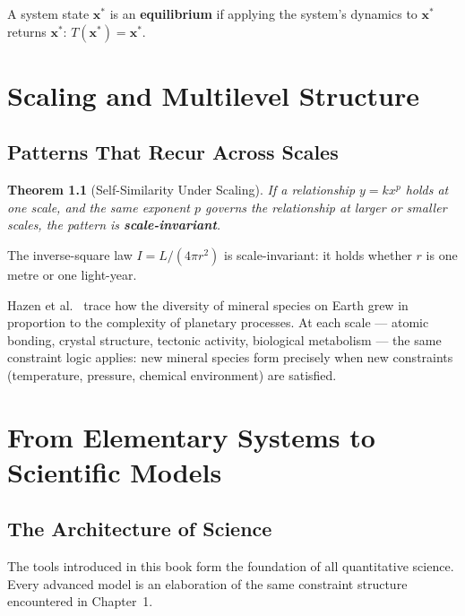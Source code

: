 \documentclass[11pt, openany]{book}
\theoremstyle{plain}
\newtheorem{theorem}{Theorem}[chapter]
\theoremstyle{definition}
\theoremstyle{remark}
\begin{document}
\begin{mydefinition}[Equilibrium]
A system state $\mathbf{x}^*$ is an \textbf{equilibrium} if applying the
system's dynamics to $\mathbf{x}^*$ returns $\mathbf{x}^*$:
$T(\mathbf{x}^*)=\mathbf{x}^*$.
\end{mydefinition}

\chapter{Scaling and Multilevel Structure}

\section{Patterns That Recur Across Scales}

\begin{theorem}[Self-Similarity Under Scaling]
If a relationship $y=kx^p$ holds at one scale, and the same exponent $p$
governs the relationship at larger or smaller scales, the pattern is
\textbf{scale-invariant}.
\end{theorem}

The inverse-square law $I=L/(4\pi r^2)$ is scale-invariant: it holds whether
$r$ is one metre or one light-year.

\begin{myexample}
Hazen et al.\ \citep{Hazen2008} trace how the diversity of mineral species on
Earth grew in proportion to the complexity of planetary processes. At each
scale --- atomic bonding, crystal structure, tectonic activity, biological
metabolism --- the same constraint logic applies: new mineral species form
precisely when new constraints (temperature, pressure, chemical environment)
are satisfied.
\end{myexample}

\chapter{From Elementary Systems to Scientific Models}

\section{The Architecture of Science}

The tools introduced in this book form the foundation of all quantitative
science. Every advanced model is an elaboration of the same constraint
structure encountered in Chapter~1.
\end{document}

